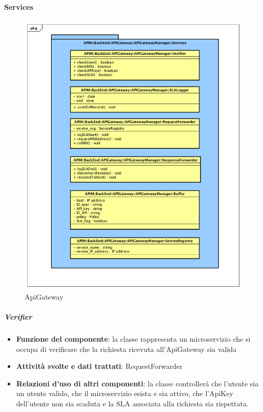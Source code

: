 \paragraph{Services}
\begin{figure}[!htbp]
	\centering
	\includegraphics[scale=0.45]{UML/DiagrammiPackage/ApiGatewayManagerServices.png}
	\caption{ApiGateway}
\end{figure}
\FloatBarrier

\subparagraph{Verifier}
\begin{itemize}
	\item \textbf{Funzione del componente}: la classe rappresenta un microservizio che si occupa di verificare che la richiesta ricevuta all'ApiGateway sia valida
	\item \textbf{Attivit\`{a} svolte e dati trattati}: RequestForwarder
	\item \textbf{Relazioni d'uso di altri componenti}: la classe controller\`{a} che l'utente sia un utente valido, che il microservizio esista e sia attivo, che l'ApiKey dell'utente non sia scaduta e la SLA associata alla richiesta sia rispettata.

\end{itemize}

